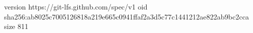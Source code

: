 version https://git-lfs.github.com/spec/v1
oid sha256:ab8025c7005126818a219e665c0941ffaf2a3d5c77c1441212ae822ab9bc2cca
size 811
